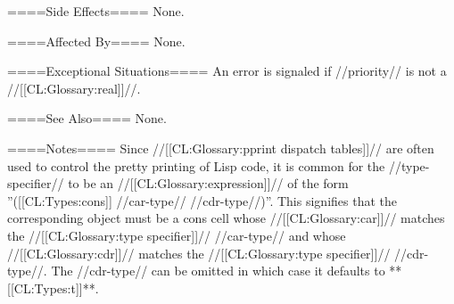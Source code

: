 ====Side Effects====
None.

====Affected By====
None.

====Exceptional Situations====
An error is signaled if //priority// is not a //[[CL:Glossary:real]]//.

====See Also====
None.

====Notes====
Since //[[CL:Glossary:pprint dispatch tables]]// are often used to control the pretty printing of Lisp code, it is common for the //type-specifier// to be an //[[CL:Glossary:expression]]// of the form ''([[CL:Types:cons]] //car-type// //cdr-type//)''. This signifies that the corresponding object must be a cons cell whose //[[CL:Glossary:car]]// matches the //[[CL:Glossary:type specifier]]// //car-type// and whose //[[CL:Glossary:cdr]]// matches the //[[CL:Glossary:type specifier]]// //cdr-type//. The //cdr-type// can be omitted in which case it defaults to **[[CL:Types:t]]**.

